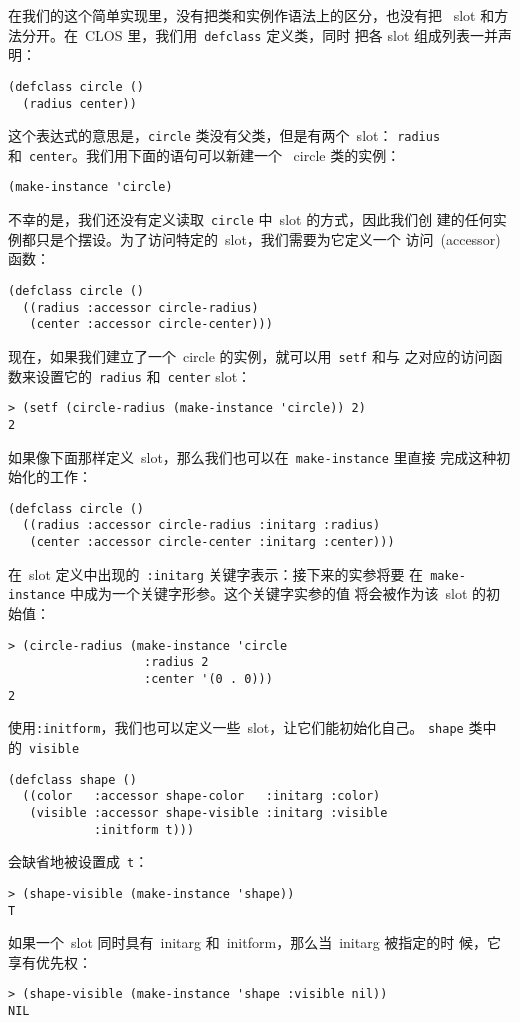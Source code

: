 在我们的这个简单实现里，没有把类和实例作语法上的区分，也没有把
~slot 和方法分开。在~CLOS 里，我们用~\texttt{defclass} 定义类，同时
把各 slot 组成列表一并声明：
\begin{lstlisting}
(defclass circle ()
  (radius center))
\end{lstlisting}
这个表达式的意思是，\texttt{circle} 类没有父类，但是有两个~slot：
\texttt{radius} 和~\texttt{center}。我们用下面的语句可以新建一个
~circle 类的实例：
\begin{lstlisting}
(make-instance 'circle)
\end{lstlisting}
不幸的是，我们还没有定义读取~\texttt{circle} 中~slot 的方式，因此我们创
建的任何实例都只是个摆设。为了访问特定的~slot，我们需要为它定义一个
访问~(accessor) 函数：
\begin{lstlisting}
(defclass circle ()
  ((radius :accessor circle-radius)
   (center :accessor circle-center)))
\end{lstlisting}
现在，如果我们建立了一个~circle 的实例，就可以用~\texttt{setf} 和与
之对应的访问函数来设置它的~\texttt{radius} 和~\texttt{center} slot：
\begin{lstlisting}
> (setf (circle-radius (make-instance 'circle)) 2)
2
\end{lstlisting}
如果像下面那样定义~slot，那么我们也可以在~\texttt{make-instance} 里直接
完成这种初始化的工作：
\begin{lstlisting}
(defclass circle ()
  ((radius :accessor circle-radius :initarg :radius)
   (center :accessor circle-center :initarg :center)))
\end{lstlisting}
在~slot 定义中出现的~\texttt{:initarg} 关键字表示：接下来的实参将要
在~\texttt{make-instance} 中成为一个关键字形参。这个关键字实参的值
将会被作为该~slot 的初始值：
\begin{lstlisting}
> (circle-radius (make-instance 'circle
                   :radius 2
                   :center '(0 . 0)))
2
\end{lstlisting}

使用\texttt{:initform}，我们也可以定义一些~slot，让它们能初始化自己。
\texttt{shape} 类中的~\texttt{visible}
\begin{lstlisting}
(defclass shape ()
  ((color   :accessor shape-color   :initarg :color)
   (visible :accessor shape-visible :initarg :visible
            :initform t)))
\end{lstlisting}
会缺省地被设置成~\texttt{t}：
\begin{lstlisting}
> (shape-visible (make-instance 'shape))
T
\end{lstlisting}
如果一个~slot 同时具有~initarg 和~initform，那么当~initarg 被指定的时
候，它享有优先权：
\begin{lstlisting}
> (shape-visible (make-instance 'shape :visible nil))
NIL
\end{lstlisting}

